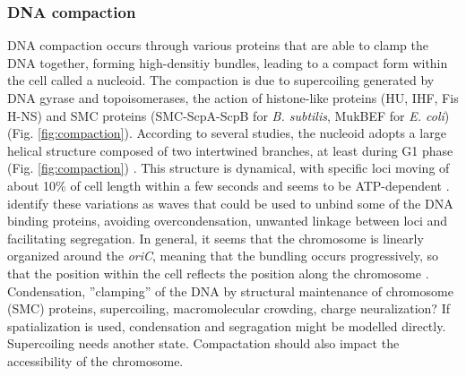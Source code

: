 \subsubsection{DNA compaction}
DNA compaction occurs through various proteins that are able to clamp the DNA together, forming high-densitiy bundles, leading to a compact form within the cell called a nucleoid. The compaction is due to supercoiling generated by DNA gyrase and topoisomerases, the action of histone-like proteins (HU, IHF, Fis H-NS) and SMC proteins (SMC-ScpA-ScpB for \textit{B. subtilis}, MukBEF for \textit{E. coli})(Fig. \ref{fig:compaction}). According to several studies, the nucleoid adopts a large helical structure composed of two intertwined branches, at least during G1 phase (Fig. \ref{fig:compaction}) \citep{berlatzky_spatial_2008, ptacin_chromosome_2013, fisher_four-dimensional_2013}. This structure is dynamical, with specific loci moving of about 10\% of cell length within a few seconds \citep{wiggins_strong_2010,fisher_four-dimensional_2013} and seems to be ATP-dependent \citep{fisher_four-dimensional_2013,weber_nonthermal_2012}. \citet{fisher_four-dimensional_2013} identify these variations as waves that could be used to unbind some of the DNA binding proteins, avoiding overcondensation, unwanted linkage between loci and facilitating segregation. In general, it seems that the chromosome is linearly organized around the \textit{oriC}, meaning that the bundling occurs progressively, so that the position within the cell reflects the position along the chromosome \citep{wiggins_strong_2010}.
\textcolor[rgb]{1.00,0.00,0.00}{Condensation, ”clamping” of the DNA by structural maintenance of chromosome (SMC) proteins, supercoiling, macromolecular crowding, charge neuralization?}
If spatialization is used, condensation and segragation might be modelled directly. Supercoiling needs another state.
\textcolor[rgb]{1.00,0.00,0.00}{Compactation should also impact the accessibility of the chromosome.}

